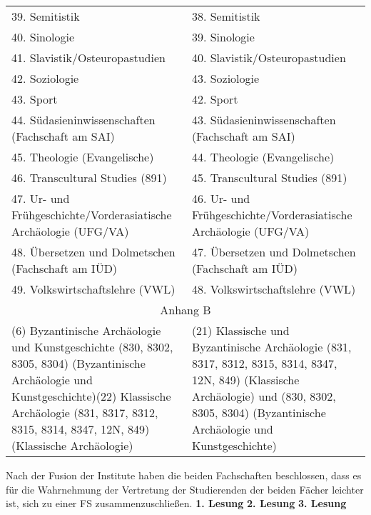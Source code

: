 {\begin{longtable}{|p{7.5cm}|p{7.5cm}|}
        39. Semitistik                                                   & 38. Semitistik                                                   \\
        40. Sinologie                                                    & 39. Sinologie                                                    \\
        41. Slavistik/Osteuropastudien                                   & 40. Slavistik/Osteuropastudien                                   \\
        42. Soziologie                                                   & 43. Soziologie                                                   \\
        43. Sport                                                        & 42. Sport                                                        \\
        44. Südasieninwissenschaften (Fachschaft am SAI)                 & 43. Südasieninwissenschaften (Fachschaft am SAI)                 \\
        45. Theologie (Evangelische)                                     & 44. Theologie (Evangelische)                                     \\
        46. Transcultural Studies (891)                                  & 45. Transcultural Studies (891)                                  \\
        47. Ur- und Frühgeschichte/Vorderasiatische Archäologie (UFG/VA) & 46. Ur- und Frühgeschichte/Vorderasiatische Archäologie (UFG/VA) \\
        48. Übersetzen und Dolmetschen (Fachschaft am IÜD)               & 47. Übersetzen und Dolmetschen (Fachschaft am IÜD)               \\
        49. Volkswirtschaftslehre (VWL)                                  & 48. Volkswirtschaftslehre (VWL)                                  \\
        \multicolumn{2}{|c|}{Anhang B}\\\hline
        (6) Byzantinische Archäologie und Kunstgeschichte (830, 8302, 8305, 8304)
        (Byzantinische Archäologie und Kunstgeschichte)\newline (22) Klassische Archäologie (831, 8317, 8312, 8315, 8314, 8347, 12N, 849) (Klassische
        Archäologie) & (21) Klassische und Byzantinische Archäologie (831, 8317, 8312, 8315, 8314, 8347,
        12N, 849) (Klassische Archäologie) und (830, 8302, 8305, 8304) (Byzantinische
        Archäologie und Kunstgeschichte)\\
    \end{longtable}
}{
    Nach der Fusion der Institute haben die beiden Fachschaften beschlossen, dass es für die Wahrnehmung der Vertretung der Studierenden der beiden Fächer leichter ist, sich zu einer FS zusammenzuschließen.
}{
    \textbf{1. Lesung}
    \ul{
    }
    \textbf{2. Lesung}
    \ul{
    }
    \textbf{3. Lesung}
    \ul{
    }
}{

}

